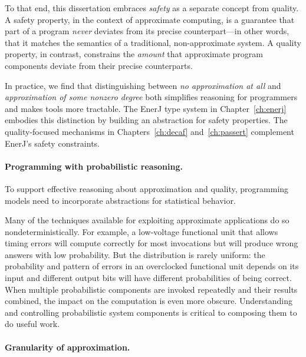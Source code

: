 To that end, this dissertation embraces \emph{safety} as a separate concept
from quality.
A safety property, in the context of approximate computing, is a guarantee
that part of a program \emph{never} deviates from its precise counterpart---in
other words, that it matches the semantics of a traditional, non-approximate
system.
A quality property, in contrast, constrains the \emph{amount} that approximate
program components deviate from their precise counterparts.

In practice, we find that distinguishing between \emph{no approximation at
all} and \emph{approximation of some nonzero degree} both simplifies reasoning
for programmers and makes tools more tractable.
The EnerJ type system in Chapter~\ref{ch:enerj} embodies this distinction by
building an abstraction for safety properties.
The quality-focused mechanisms in Chapters~\ref{ch:decaf} and~\ref{ch:passert}
complement EnerJ's safety constraints.

\paragraph{Programming with probabilistic reasoning.}

To support effective reasoning about approximation and quality,
programming models need to incorporate abstractions for statistical behavior.

Many of the techniques available for exploiting approximate applications do so
nondeterministically. For example, a low-voltage functional unit that allows
timing errors will compute correctly for most invocations but will produce wrong
answers with low probability. But the distribution is rarely uniform: the
probability and pattern of errors in an overclocked functional unit depends on
its input and different output bits will have different probabilities of being
correct. When multiple probabilistic components are invoked repeatedly and
their results combined, the impact on the computation is even more obscure.
Understanding and controlling probabilistic system components is critical to
composing them to do useful work.

\paragraph{Granularity of approximation.}

